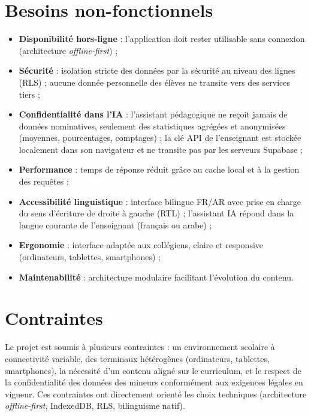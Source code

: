 \documentclass[12pt, a4paper, oneside]{report}
\begin{document}
\section{Besoins non-fonctionnels}
\begin{itemize}[leftmargin=*]
  \item \textbf{Disponibilité hors-ligne} : l'application doit rester utilisable sans connexion (architecture \textit{offline-first}) ;
  \item \textbf{Sécurité} : isolation stricte des données par la sécurité au niveau des lignes (RLS) ; aucune donnée personnelle des élèves ne transite vers des services tiers ;
  \item \textbf{Confidentialité dans l'IA} : l'assistant pédagogique ne reçoit jamais de données nominatives, seulement des statistiques agrégées et anonymisées (moyennes, pourcentages, comptages) ; la clé API de l'enseignant est stockée localement dans son navigateur et ne transite pas par les serveurs Supabase ;
  \item \textbf{Performance} : temps de réponse réduit grâce au cache local et à la gestion des requêtes ;
  \item \textbf{Accessibilité linguistique} : interface bilingue FR/AR avec prise en charge du sens d'écriture de droite à gauche (RTL) ; l'assistant IA répond dans la langue courante de l'enseignant (français ou arabe) ;
  \item \textbf{Ergonomie} : interface adaptée aux collégiens, claire et responsive (ordinateurs, tablettes, smartphones) ;
  \item \textbf{Maintenabilité} : architecture modulaire facilitant l'évolution du contenu.
\end{itemize}

\section{Contraintes}
Le projet est soumis à plusieurs contraintes : un environnement scolaire à connectivité variable, des terminaux hétérogènes (ordinateurs, tablettes, smartphones), la nécessité d'un contenu aligné sur le curriculum, et le respect de la confidentialité des données des mineurs conformément aux exigences légales en vigueur. Ces contraintes ont directement orienté les choix techniques (architecture \textit{offline-first}, IndexedDB, RLS, bilinguisme natif).

\end{document}
